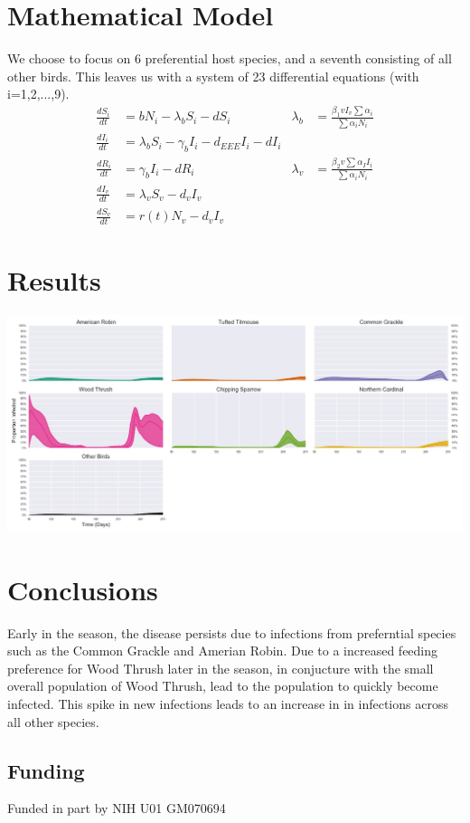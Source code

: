 \documentclass[landscape]{sciposter}
\begin{document}
\begin{multicols}{3}
\columnbreak

 \section*{Mathematical Model}
We choose to focus on 6 preferential host species, and a seventh consisting of all other birds.  This leaves us with a system of 23 differential equations (with i=1,2,...,9). \\
\begin{align*}
\frac{dS_i}{dt} &= \textit{b}N_i - \lambda_bS_i - \textit{d}S_i&  
\lambda_b &= \frac{\beta_1vI_v\sum\alpha_i}{\sum\alpha_iN_i} \\
\frac{dI_i}{dt} &=  \lambda_bS_i -  \gamma_bI_i-d_{EEE}I_i - \textit{d}I_i \\
\frac{dR_i}{dt} &= \gamma_bI_i - \textit{d}R_i&
\lambda_v &= \frac{\beta_2v\sum\alpha_II_i}{\sum\alpha_iN_i} \\
\frac{dI_v}{dt} &= \lambda_vS_v - d_vI_v \\
\frac{dS_v}{dt} &= r(t)N_v - d_vI_v&
\end{align*}

\section*{Results}
\includegraphics[width=\linewidth]{Results}

\section*{Conclusions}
Early in the season, the disease persists due to infections from preferntial species such as the Common Grackle and Amerian Robin.  Due to a increased feeding preference for Wood Thrush later in the season, in conjucture with the small overall population of Wood Thrush, lead to the population to quickly become infected.  This spike in new infections leads to an increase in in infections across all other species. 

\subsection*{Funding}
Funded in part by NIH U01 GM070694

\end{multicols}
\end{document}
